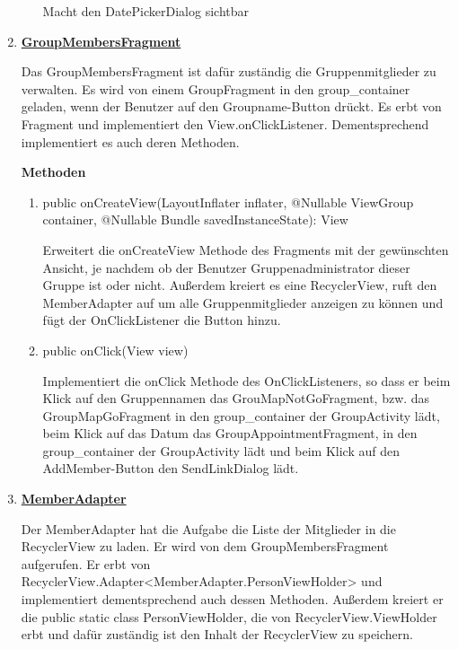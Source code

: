 \begin{enumerate}
\begin{enumerate}
		Macht den DatePickerDialog sichtbar
	
	\end{enumerate}


	\item \textbf{\underline{GroupMembersFragment}}
	
	Das GroupMembersFragment ist dafür zuständig die Gruppenmitglieder zu verwalten. Es wird von einem GroupFragment in den group\_container geladen, wenn der Benutzer auf den Groupname-Button drückt. Es erbt von Fragment und implementiert den View.onClickListener. Dementsprechend implementiert es auch deren Methoden.
	
	\textbf{Methoden}
	\begin{enumerate}
		\item public onCreateView(LayoutInflater inflater, @Nullable ViewGroup container, @Nullable Bundle savedInstanceState): View
		
		Erweitert die onCreateView Methode des Fragments mit der gewünschten Ansicht, je nachdem ob der Benutzer Gruppenadministrator dieser Gruppe ist oder nicht. Außerdem kreiert es eine RecyclerView, ruft den MemberAdapter auf um alle Gruppenmitglieder anzeigen zu können und fügt der OnClickListener die Button hinzu.
		
		\item public onClick(View view)
		
		Implementiert die onClick Methode des OnClickListeners, so dass er beim Klick auf den Gruppennamen das GrouMapNotGoFragment, bzw. das GroupMapGoFragment in den group\_container der GroupActivity lädt, beim Klick auf das Datum das GroupAppointmentFragment, in den group\_container der GroupActivity lädt und beim Klick auf den AddMember-Button den SendLinkDialog lädt.
	\end{enumerate}
	\item \textbf{\underline{MemberAdapter}}

	Der MemberAdapter hat die Aufgabe die Liste der Mitglieder in die RecyclerView zu laden. Er wird von dem GroupMembersFragment aufgerufen. Er erbt von RecyclerView.Adapter<MemberAdapter.PersonViewHolder> und implementiert dementsprechend auch dessen Methoden. Außerdem kreiert er die public static class PersonViewHolder, die von RecyclerView.ViewHolder erbt und dafür zuständig ist den Inhalt der RecyclerView zu speichern.


\end{enumerate}
